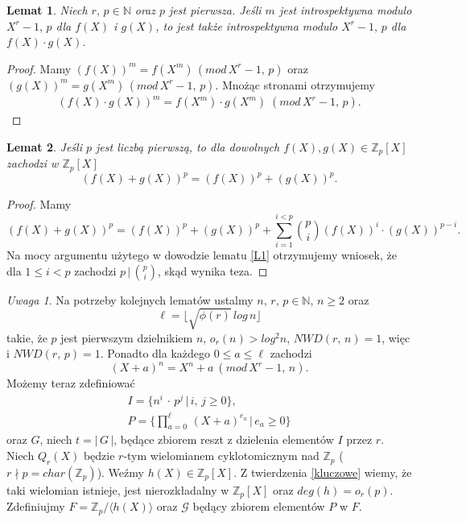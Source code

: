 \documentclass[declaration,shortabstract]{iithesis}
\theoremstyle{definition}
\theoremstyle{remark} \newtheorem{observation}{Obserwacja}
\theoremstyle{plain} \newtheorem{theorem}{Twierdzenie}
\theoremstyle{plain} \newtheorem{lemma}{Lemat}
\theoremstyle{remark} \newtheorem*{remark*}{Uwaga}
\theoremstyle{reminder} \newtheorem*{reminder*}{Przypomnienie}
\begin{document}
\begin{lemma}\label{intro2}
	Niech $r, \, p \in \mathbb{N}$ oraz $p$ jest pierwsza. Jeśli $m$ jest introspektywna modulo $X^r - 1, \, p$ dla $f(X)$ i $g(X)$, to jest także introspektywna modulo $X^r - 1, \, p$ dla ${f(X) \cdot g(X)}$.
\end{lemma}
	
\begin{proof}
    Mamy $(f(X))^m = f(X^m) \, (mod \, X^r - 1, \, p)$ oraz $(g(X))^m = g(X^m) \, (mod \, X^r - 1, \, p)$. Mnożąc stronami otrzymujemy 
    \begin{align*}
        (f(X) \cdot g(X))^m = f(X^m) \cdot g(X^m) \; (mod \, X^r - 1, \, p).
    \end{align*}
\end{proof}

\begin{lemma}\label{p_intro}
	Jeśli $p$ jest liczbą pierwszą, to dla dowolnych $f(X), g(X) \in \mathbb{Z}_p[X]$ zachodzi w $\mathbb{Z}_p[X]$ \[(f(X) + g(X))^p = (f(X))^p + (g(X))^p.\]
\end{lemma}
	
\begin{proof}
	Mamy \[(f(X) + g(X))^p = (f(X))^p + (g(X))^p + \sum_{i=1}^{i < p}{p \choose i}(f(X))^i\cdot(g(X))^{p - i}.\] Na mocy argumentu użytego w dowodzie lematu \ref{L1} otrzymujemy wniosek, że dla $1 \leq i < p$ zachodzi $p \, | \, {p \choose i}$, skąd wynika teza.
\end{proof}

\begin{remark*}\label{def}
    Na potrzeby kolejnych lematów ustalmy $n, \, r, \, p \in \mathbb{N}, \, n \geq 2 
    $ oraz \[\ell = \lfloor\sqrt{\phi (r)} \, log \, n \rfloor\] takie, że $p$ jest pierwszym dzielnikiem $n$, $o_r(n) > log^2n$, $NWD(r, \, n) = 1$, więc i $NWD(r, \, p) = 1$. Ponadto dla każdego $0 \leq a \leq \ell$ zachodzi \[(X + a)^n = X^n + a \: (mod \, X^r - 1, \, n).\] Możemy teraz zdefiniować 
    \begin{align*}
        I = \{n^i \, \cdot \, p^j \, | \, i, \, j \geq 0\}, \\
        P = \{\prod_{a=0}^{\ell} \, (X + a)^{e_a} \, | \, e_a \geq 0\}
    \end{align*}
     oraz $G$, niech $t = | \, G \, |$, będące zbiorem reszt z dzielenia elementów $I$ przez $r$. Niech $Q_r(X)$ będzie $r$-tym wielomianem cyklotomicznym nad $\mathbb{Z}_p$ ($ r \nmid p = char(\mathbb{Z}_p)$). Weźmy $h(X) \in \mathbb{Z}_p[X]$. Z twierdzenia \ref{kluczowe} wiemy, że taki wielomian istnieje, jest nierozkładalny w $\mathbb{Z}_p[X]$ oraz $deg(h) = o_r(p)$. Zdefiniujmy $F = \mathbb{Z}_p / \langle h(X) \rangle$ oraz $\mathcal{G}$ będący zbiorem elementów $P$ w $F$.
\end{remark*}
\end{document}
